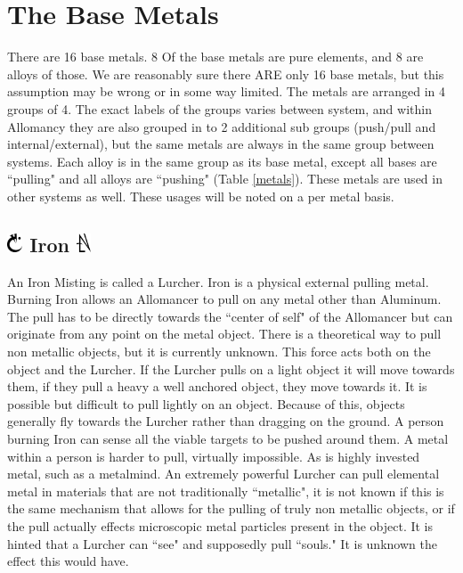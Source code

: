 \documentclass[conference]{IEEEtran}
\begin{document}
\hfill
\section*{The Base Metals}
There are 16 base metals. 8 Of the base metals are pure elements, and 8 are alloys of those.  We are reasonably sure there ARE only 16 base metals, but this assumption may be wrong or in some way limited. The metals are arranged in 4 groups of 4.  The exact labels of the groups varies between system, and within Allomancy they are also grouped in to 2 additional sub groups (push/pull and internal/external), but the same metals are always in the same group between systems.  Each alloy is in the same group as its base metal, except all bases are ``pulling" and all alloys are ``pushing" (Table \ref{metals}).
These metals are used in other systems as well.  These usages will be noted on a per metal basis.
\subsection*{\includegraphics[height=1em]{images/Iron.png}  Iron \includegraphics[height=1em]{images/Iron_(Feruchemy).png}}
An Iron Misting is called a Lurcher.  Iron is a physical external pulling metal.  Burning Iron allows an Allomancer to pull on any metal other than Aluminum.  The pull has to be directly towards the ``center of self" of the Allomancer but can originate from any point on the metal object.  There is a theoretical way to pull non metallic objects, but it is currently unknown.
This force acts both on the object and the Lurcher. If the Lurcher pulls on a light object it will move towards them, if they pull a heavy a well anchored object, they move towards it.  
It is possible but difficult to pull lightly on an object.  Because of this, objects generally fly towards the Lurcher rather than dragging on the ground.
A person burning Iron can sense all the viable targets to be pushed around them.
A metal within a person is harder to pull, virtually impossible.  As is highly invested metal, such as a metalmind.
An extremely powerful Lurcher can pull elemental metal in materials that are not traditionally ``metallic", it is not known if this is the same mechanism that allows for the pulling of truly non metallic objects, or if the pull actually effects microscopic metal particles present in the object.
It is hinted that a Lurcher can ``see" and supposedly pull ``souls." It is unknown the effect this would have.\\
\end{document}
